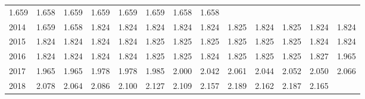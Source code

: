 \begin{tabular}{lllllllllllll}
  \multicolumn{1}{r}{1.659} &
  \multicolumn{1}{r}{1.658} &
  \multicolumn{1}{r}{1.659} &
  \multicolumn{1}{r}{1.659} &
  \multicolumn{1}{r}{1.659} &
  \multicolumn{1}{r}{1.659} &
  \multicolumn{1}{r}{1.658} &
  \multicolumn{1}{r}{1.658} \\
\multicolumn{1}{l}{\hspace{1em}2014} &
  \multicolumn{1}{|r}{1.659} &
  \multicolumn{1}{r}{1.658} &
  \multicolumn{1}{r}{1.824} &
  \multicolumn{1}{r}{1.824} &
  \multicolumn{1}{r}{1.824} &
  \multicolumn{1}{r}{1.824} &
  \multicolumn{1}{r}{1.824} &
  \multicolumn{1}{r}{1.825} &
  \multicolumn{1}{r}{1.824} &
  \multicolumn{1}{r}{1.825} &
  \multicolumn{1}{r}{1.824} &
  \multicolumn{1}{r}{1.824} \\
\multicolumn{1}{l}{\hspace{1em}2015} &
  \multicolumn{1}{|r}{1.824} &
  \multicolumn{1}{r}{1.824} &
  \multicolumn{1}{r}{1.824} &
  \multicolumn{1}{r}{1.824} &
  \multicolumn{1}{r}{1.825} &
  \multicolumn{1}{r}{1.825} &
  \multicolumn{1}{r}{1.825} &
  \multicolumn{1}{r}{1.825} &
  \multicolumn{1}{r}{1.825} &
  \multicolumn{1}{r}{1.825} &
  \multicolumn{1}{r}{1.824} &
  \multicolumn{1}{r}{1.824} \\
\multicolumn{1}{l}{\hspace{1em}2016} &
  \multicolumn{1}{|r}{1.824} &
  \multicolumn{1}{r}{1.824} &
  \multicolumn{1}{r}{1.824} &
  \multicolumn{1}{r}{1.824} &
  \multicolumn{1}{r}{1.825} &
  \multicolumn{1}{r}{1.825} &
  \multicolumn{1}{r}{1.824} &
  \multicolumn{1}{r}{1.825} &
  \multicolumn{1}{r}{1.825} &
  \multicolumn{1}{r}{1.825} &
  \multicolumn{1}{r}{1.827} &
  \multicolumn{1}{r}{1.965} \\
\multicolumn{1}{l}{\hspace{1em}2017} &
  \multicolumn{1}{|r}{1.965} &
  \multicolumn{1}{r}{1.965} &
  \multicolumn{1}{r}{1.978} &
  \multicolumn{1}{r}{1.978} &
  \multicolumn{1}{r}{1.985} &
  \multicolumn{1}{r}{2.000} &
  \multicolumn{1}{r}{2.042} &
  \multicolumn{1}{r}{2.061} &
  \multicolumn{1}{r}{2.044} &
  \multicolumn{1}{r}{2.052} &
  \multicolumn{1}{r}{2.050} &
  \multicolumn{1}{r}{2.066} \\
\multicolumn{1}{l}{\hspace{1em}2018} &
  \multicolumn{1}{|r}{2.078} &
  \multicolumn{1}{r}{2.064} &
  \multicolumn{1}{r}{2.086} &
  \multicolumn{1}{r}{2.100} &
  \multicolumn{1}{r}{2.127} &
  \multicolumn{1}{r}{2.109} &
  \multicolumn{1}{r}{2.157} &
  \multicolumn{1}{r}{2.189} &
  \multicolumn{1}{r}{2.162} &
  \multicolumn{1}{r}{2.187} &
  \multicolumn{1}{r}{2.165} &

\end{tabular}
